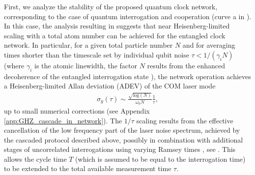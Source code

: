 First, we analyze the stability of the proposed quantum clock network,
corresponding to the case of quantum interrogation and cooperation (curve a in
). In this case, the analysis resulting in 
suggests that near Heisenberg-limited  scaling with a total atom number can be achieved
for the entangled clock network. 
In particular, for a given total particle number $N$ and for averaging times
shorter than the timescale set by individual qubit noise $\tau < 1/(\gamma_i N)$
(where $\gamma_i$ is the atomic linewidth, the factor $N$ results from the
enhanced decoherence of the entangled interrogation state
\cite{Huelga1997}), the network operation achieves a Heisenberg-limited Allan
deviation (ADEV) of the COM laser mode
\begin{align}
\label{eq:ADEV1}
 	\sigma_y(\tau) 
	\sim \frac{ \sqrt{\textrm{log}(N)}}{\omega_0 N} \frac{1}{\tau},
\end{align}
up to small numerical corrections (see Appendix \ref{app:GHZ_cascade_in_network}).
The $1/\tau$ scaling results from the effective cancellation of the low
frequency part of the laser noise spectrum, achieved
by the cascaded protocol described above, possibly in combination with additional stages of uncorrelated interrogations using varying Ramsey times \cite{Rosenband2013,Borregaard2013}, see \cite{Kessler2014}.
This allows the cycle time $T$ (which is assumed to be equal to
the interrogation time) to be extended to the total available measurement time
$\tau$.
